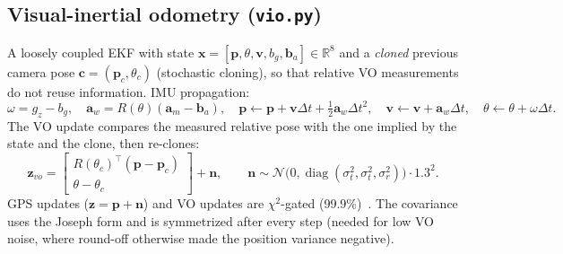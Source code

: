 \documentclass[11pt,a4paper]{article}
\begin{document}
\subsection{Visual-inertial odometry (\texttt{vio.py})}
A loosely coupled EKF with state $\mathbf{x}=[\mathbf{p},\theta,\mathbf{v},b_g,\mathbf{b}_a]\in\mathbb{R}^8$ and a \emph{cloned} previous camera pose $\mathbf{c}=(\mathbf{p}_c,\theta_c)$ (stochastic cloning), so that relative VO measurements do not reuse information. IMU propagation:
\begin{equation}
\omega=g_z-b_g,\quad \mathbf{a}_w=R(\theta)(\mathbf{a}_m-\mathbf{b}_a),\quad
\mathbf{p}\!\leftarrow\!\mathbf{p}+\mathbf{v}\Delta t+\tfrac12\mathbf{a}_w\Delta t^2,\quad \mathbf{v}\!\leftarrow\!\mathbf{v}+\mathbf{a}_w\Delta t,\quad \theta\!\leftarrow\!\theta+\omega\Delta t .
\end{equation}
The VO update compares the measured relative pose with the one implied by the state and the clone, then re-clones:
\begin{equation}
\mathbf{z}_{vo}=\begin{bmatrix}R(\theta_c)^{\!\top}(\mathbf{p}-\mathbf{p}_c)\\ \theta-\theta_c\end{bmatrix}+\mathbf{n},\qquad \mathbf{n}\sim\mathcal{N}\big(0,\operatorname{diag}(\sigma_t^2,\sigma_t^2,\sigma_r^2)\big)\cdot 1.3^2 .
\end{equation}
GPS updates ($\mathbf{z}=\mathbf{p}+\mathbf{n}$) and VO updates are $\chi^2$-gated (99.9\%)~\cite{barshalom01}. The covariance uses the Joseph form and is symmetrized after every step (needed for low VO noise, where round-off otherwise made the position variance negative).
\end{document}
